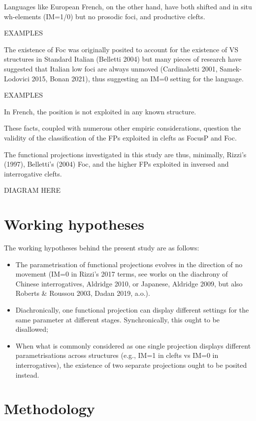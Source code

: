 \documentclass[fleqn,10pt]{wlscirep}
\begin{document}
Languages like European French, on the other hand, have both shifted and in situ wh-elements (IM=1/0) but no prosodic foci, and productive clefts. 

EXAMPLES

The existence of Foc was originally posited to account for the existence of VS structures in Standard Italian (Belletti 2004) but many pieces of research have suggested that Italian low foci are always unmoved (Cardinaletti 2001, Samek-Lodovici 2015, Bonan 2021), thus suggesting an IM=0 setting for the language. 

EXAMPLES

In French, the position is not exploited in any known structure. 

These facts, coupled with numerous other empiric considerations, question the validity of the classification of the FPs exploited in clefts as FocusP and Foc. 

The functional projections investigated in this study are thus, minimally, Rizzi’s (1997), Belletti’s (2004) Foc, and the higher FPs exploited in inversed and interrogative clefts.

DIAGRAM HERE

\section*{Working hypotheses}
The working hypotheses behind the present study are as follows:

\begin{itemize}
\item The parametrisation of functional projections evolves in the direction of no movement (IM=0 in Rizzi’s 2017 terms, see works on the diachrony of Chinese interrogatives, Aldridge 2010, or Japanese, Aldridge 2009, but also Roberts & Roussou 2003, Dadan 2019, a.o.).

\item Diachronically, one functional projection can display different settings for the same parameter at different stages. Synchronically, this ought to be disallowed;
\item When what is commonly considered as one single projection displays different parametrisations across structures (e.g., IM=1 in clefts vs IM=0 in interrogatives), the existence of two separate projections ought to be posited instead.
\end{itemize}

\section*{Methodology}
\end{document}
